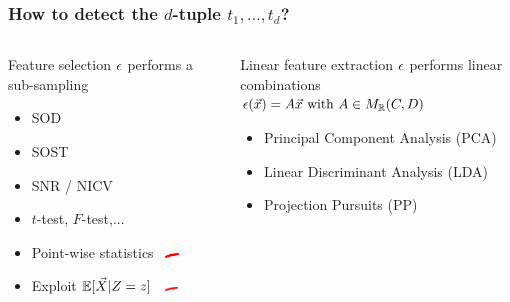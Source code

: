 \begin{frame}
\vspace*{-10pt}
\frametitle{How to detect the $d$-tuple $t_1,\dots, t_d$?}
\begin{columns}

\begin{column}{.4\textwidth}
\begin{scriptsize}
\begin{block}{Feature selection}
$\epsilon$ performs a sub-sampling
\begin{itemize}
\item SOD \textcolor{cyan}{\cite{Chari2003}}
\item SOST \textcolor{cyan}{\cite{bar2010improved}}
\item SNR \textcolor{cyan}{\cite{mangard2008power}}/ NICV \textcolor{cyan}{\cite{bhasin2014side}}
\item $t$-test, $F$-test,... \textcolor{cyan}{\cite{gierlichs2006templates,choudary2014efficient}}
\end{itemize}
\end{block}
\end{scriptsize}

\begin{itemize}
\item Point-wise statistics \ \includegraphics[width=10pt]{figures/no.png}
\item Exploit $\mathbb{E}[\vec{X}\lvert Z=z]$ \ \includegraphics[width=10pt]{figures/no.png}
\end{itemize}
\end{column}


\begin{column}{.6\textwidth}
\begin{scriptsize}

\begin{block}{Linear feature extraction}
$\epsilon$ performs linear combinations\\
$\epsilon(\vec{x}) = A\vec{x} \mbox{ with } A \in M_{\mathbb{R}}(C, D)$
\begin{itemize}
\item Principal Component Analysis (PCA) \textcolor{cyan}{\cite{TAprincipal,Batina2012}}
\item Linear Discriminant Analysis (LDA) \textcolor{cyan}{\cite{Standaert2008,lessIsMore}}
\item Projection Pursuits (PP) \textcolor{cyan}{\cite{PP}}
\end{itemize}
\end{block}
\end{scriptsize}


\end{column}
\end{columns}
\end{frame}
